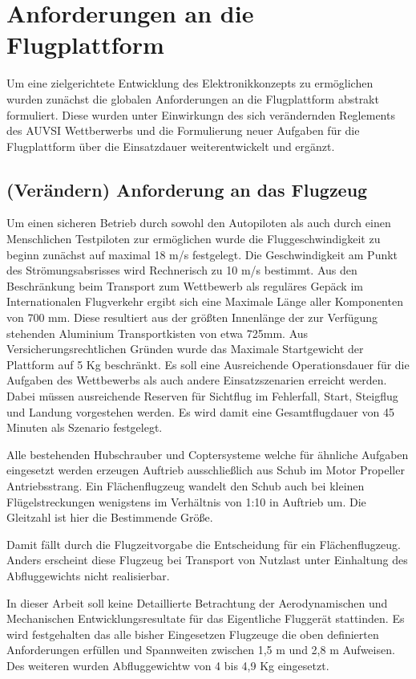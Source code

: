 \chapter{Anforderungen an die Flugplattform}\label{cha:Anforderungen an die Flugplattform}

Um eine zielgerichtete Entwicklung des Elektronikkonzepts zu ermöglichen wurden zunächst die globalen Anforderungen an die Flugplattform abstrakt formuliert. Diese wurden unter Einwirkungn des sich verändernden Reglements des AUVSI Wettberwerbs und die Formulierung neuer Aufgaben für die Flugplattform über die Einsatzdauer weiterentwickelt und ergänzt.  


\section{(Verändern) Anforderung an das Flugzeug}

Um einen sicheren Betrieb durch sowohl den Autopiloten als auch durch einen Menschlichen Testpiloten zur ermöglichen
wurde die Fluggeschwindigkeit zu beginn zunächst auf maximal 18 m/s festgelegt. Die Geschwindigkeit am Punkt des Strömungsabsrisses wird Rechnerisch zu 10 m/s bestimmt.
Aus den Beschränkung beim Transport zum Wettbewerb als reguläres Gepäck im Internationalen Flugverkehr ergibt sich eine Maximale Länge aller Komponenten von 700 mm. Diese resultiert aus der größten Innenlänge der zur Verfügung stehenden Aluminium Transportkisten von etwa 725mm.
Aus Versicherungsrechtlichen Gründen wurde das Maximale Startgewicht der Plattform auf 5 Kg beschränkt.
Es soll eine Ausreichende Operationsdauer für die Aufgaben des Wettbewerbs als auch andere Einsatzszenarien 
erreicht werden. Dabei müssen ausreichende Reserven für Sichtflug im Fehlerfall, Start, Steigflug und Landung vorgestehen werden.
Es wird damit eine Gesamtflugdauer von 45 Minuten als Szenario festgelegt.

Alle bestehenden Hubschrauber und Coptersysteme welche für ähnliche Aufgaben eingesetzt werden erzeugen Auftrieb ausschließlich aus Schub im Motor Propeller Antriebsstrang. Ein Flächenflugzeug wandelt den Schub auch bei kleinen Flügelstreckungen wenigstens im Verhältnis von 1:10 in Auftrieb um. Die Gleitzahl ist hier die Bestimmende Größe.

Damit fällt durch die Flugzeitvorgabe die Entscheidung für ein Flächenflugzeug. Anders erscheint diese Flugzeug bei Transport von Nutzlast unter Einhaltung des Abfluggewichts nicht realisierbar.

In dieser Arbeit soll keine Detaillierte Betrachtung der Aerodynamischen und Mechanischen Entwicklungsresultate für das Eigentliche Fluggerät stattinden. Es wird festgehalten das alle bisher Eingesetzen Flugzeuge die oben definierten Anforderungen erfüllen und Spannweiten zwischen 1,5 m und 2,8 m Aufweisen. Des weiteren wurden Abfluggewichtw von 4 bis 4,9 Kg eingesetzt.


